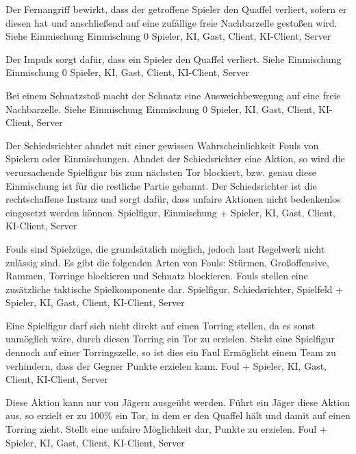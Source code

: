         {Der Fernangriff bewirkt, dass der getroffene Spieler den Quaffel verliert, sofern er diesen hat und anschließend auf eine zufällige freie Nachbarzelle gestoßen wird.}
        {Siehe Einmischung}
        {Einmischung}
        {0}
        {Spieler, KI, Gast, Client, KI-Client, Server}

        {Der Impuls sorgt dafür, dass ein Spieler den Quaffel verliert.}
        {Siehe Einmischung}
        {Einmischung}
        {0}
        {Spieler, KI, Gast, Client, KI-Client, Server}

        {Bei einem Schnatzstoß macht der Schnatz eine Ausweichbewegung auf eine freie Nachbarzelle.}
        {Siehe Einmischung}
        {Einmischung}
        {0}
        {Spieler, KI, Gast, Client, KI-Client, Server}
        
        {Der Schiedsrichter ahndet mit einer gewissen Wahrscheinlichkeit Fouls von Spielern oder Einmischungen. Ahndet der Schiedsrichter eine Aktion, so wird die verursachende Spielfigur bis zum nächsten Tor blockiert, bzw. genau diese Einmischung ist für die restliche Partie gebannt.}
        {Der Schiedsrichter ist die rechtschaffene Instanz und sorgt dafür, dass unfaire Aktionen nicht bedenkenlos eingesetzt werden können.}
        {Spielfigur, Einmischung}
        {+}
        {Spieler, KI, Gast, Client, KI-Client, Server}

        {Fouls sind Spielzüge, die grundsätzlich möglich, jedoch laut Regelwerk nicht zulässig sind. Es gibt die folgenden Arten von Fouls: Stürmen, Großoffensive, Rammen, Torringe blockieren und Schnatz blockieren.}
        {Fouls stellen eine zusätzliche taktische Spielkomponente dar.}
        {Spielfigur, Schiedsrichter, Spielfeld}
        {+}
        {Spieler, KI, Gast, Client, KI-Client, Server}

        {Eine Spielfigur darf sich nicht direkt auf einen Torring stellen, da es sonst unmöglich wäre, durch diesen Torring ein Tor zu erzielen. Steht eine Spielfigur dennoch auf einer Torringszelle, so ist dies ein Faul}
        {Ermöglicht einem Team zu verhindern, dass der Gegner Punkte erzielen kann.}
        {Foul}
        {+}
        {Spieler, KI, Gast, Client, KI-Client, Server}

        {Diese Aktion kann nur von Jägern ausgeübt werden. Führt ein Jäger diese Aktion aus, so erzielt er zu 100\% ein Tor, in dem er den Quaffel hält und damit auf einen Torring zieht.}
        {Stellt eine unfaire Möglichkeit dar, Punkte zu erzielen.}
        {Foul}
        {+}
        {Spieler, KI, Gast, Client, KI-Client, Server}


